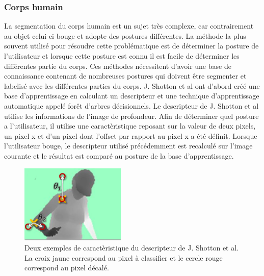 \subsubsection{Corps humain}
La segmentation du corps humain est un sujet très complexe, car contrairement au objet celui-ci bouge et adopte
des postures différentes. La méthode la plus souvent utilisé pour résoudre cette problématique est de déterminer
la posture de l'utilisateur et lorsque cette posture est connu il est facile de déterminer les différentes partie
du corps. Ces méthodes nécessitent d'avoir une base de connaissance contenant de nombreuses postures qui doivent
être segmenter et labelisé avec les différentes parties du corps. J. Shotton et al\cite{kinectSegmentation} ont
d'abord créé une base d'apprentissage en calculant un descripteur
et une technique d'apprentissage automatique appelé forêt d'arbres décisionnels\cite{randomDecisionForest}. 
Le descripteur de J. Shotton et al\cite{kinectSegmentation} utilise les informations de l'image de 
profondeur. Afin de déterminer quel posture a l'utilisateur, il utilise une caractèristique reposant sur la valeur
de deux pixels, un pixel x et d'un pixel dont l'offset par rapport au pixel x a été définit.
Lorsque l'utilisateur bouge, le descripteur utilisé précédemment est recalculé sur l'image courante et le résultat 
est comparé au posture de la base d'apprentissage.\\
\begin{figure}[!ht]
  \begin{center}
    \includegraphics[width=5cm]{image/shotton.png}
    \caption{Deux exemples de caractèristique du descripteur de J. Shotton et al\cite{kinectSegmentation}. 
    La croix jaune correspond au pixel à classifier et le cercle rouge correspond au pixel décalé.}
  \end{center}
\end{figure}

